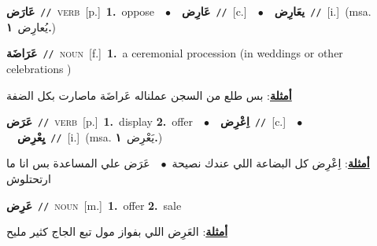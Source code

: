 \documentclass[10pt,a4paper,twoside]{article} %
\begin{document}
\begin{multicols}{2}
{\setlength\topsep{0pt}\textbf{\foreignlanguage{arabic}{عَارَض}}\ {\color{gray}\texttt{//}\color{black}}\ \textsc{verb}\ [p.]\ \textbf{1.}~oppose\ \ $\bullet$\ \ \setlength\topsep{0pt}\textbf{\foreignlanguage{arabic}{عَارِض}}\ {\color{gray}\texttt{//}\color{black}}\ [c.]\ \ $\bullet$\ \ \setlength\topsep{0pt}\textbf{\foreignlanguage{arabic}{يعَارِض}}\ {\color{gray}\texttt{//}\color{black}}\ [i.]\ \color{gray}(msa. \foreignlanguage{arabic}{يُعارِض}~\foreignlanguage{arabic}{\textbf{١.}})\color{black}\ } \vspace{2mm}

{\setlength\topsep{0pt}\textbf{\foreignlanguage{arabic}{عَرَاضَة}}\ {\color{gray}\texttt{//}\color{black}}\ \textsc{noun}\ [f.]\ \textbf{1.}~a ceremonial procession (in weddings or other celebrations )\  \begin{flushright}\color{gray}\foreignlanguage{arabic}{\textbf{\underline{\foreignlanguage{arabic}{أمثلة}}}: بس طلع من السجن عملناله عَراضَة ماصارت بكل الضفة}\end{flushright}\color{black}} \vspace{2mm}

{\setlength\topsep{0pt}\textbf{\foreignlanguage{arabic}{عَرَض}}\ {\color{gray}\texttt{//}\color{black}}\ \textsc{verb}\ [p.]\ \textbf{1.}~display  \textbf{2.}~offer\ \ $\bullet$\ \ \setlength\topsep{0pt}\textbf{\foreignlanguage{arabic}{اِعْرِض}}\ {\color{gray}\texttt{//}\color{black}}\ [c.]\ \ $\bullet$\ \ \setlength\topsep{0pt}\textbf{\foreignlanguage{arabic}{يِعْرِض}}\ {\color{gray}\texttt{//}\color{black}}\ [i.]\ \color{gray}(msa. \foreignlanguage{arabic}{يَعْرِض}~\foreignlanguage{arabic}{\textbf{١.}})\color{black}\  \begin{flushright}\color{gray}\foreignlanguage{arabic}{\textbf{\underline{\foreignlanguage{arabic}{أمثلة}}}: اِعْرِض كل البضاعة اللي عندك نصيحة\ $\bullet$\ \  عَرَض علي المساعدة بس انا ما ارتحتلوش}\end{flushright}\color{black}} \vspace{2mm}

{\setlength\topsep{0pt}\textbf{\foreignlanguage{arabic}{عَرِض}}\ {\color{gray}\texttt{//}\color{black}}\ \textsc{noun}\ [m.]\ \textbf{1.}~offer  \textbf{2.}~sale\  \begin{flushright}\color{gray}\foreignlanguage{arabic}{\textbf{\underline{\foreignlanguage{arabic}{أمثلة}}}: العَرِض اللي بفواز مول تبع الجاج كثير مليح}\end{flushright}\color{black}} \vspace{2mm}


\end{multicols}
\end{document}

